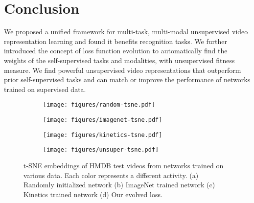 \documentclass[10pt,twocolumn,letterpaper]{article}
\begin{document}
\vspace{-2mm}
\section{Conclusion}
\vspace{-1mm}
We proposed a unified framework for multi-task, multi-modal unsupervised video representation learning and found it benefits recognition tasks. We further introduced the concept of loss function evolution to automatically find the weights of the self-supervised tasks and modalities, with unsupervised fitness measure. We find powerful unsupervised video representations that outperform prior self-supervised tasks and can match or improve the performance of networks trained on supervised data.











{\small


}

\clearpage
\newpage
\appendix


\begin{figure*}
\begin{subfigure}{.5\textwidth}
  \centering
  \texttt{[image: figures/random-tsne.pdf]}
  \caption{}
  \label{fig:tsnesfig1}
\end{subfigure}\begin{subfigure}{.5\textwidth}
  \centering
  \texttt{[image: figures/imagenet-tsne.pdf]}
  \caption{}
  \label{fig:tsnesfig2}
\end{subfigure}
\begin{subfigure}{.5\textwidth}
  \centering
  \texttt{[image: figures/kinetics-tsne.pdf]}
  \caption{}
  \label{fig:tsnesfig3}
\end{subfigure}\begin{subfigure}{.5\textwidth}
  \centering
  \texttt{[image: figures/unsuper-tsne.pdf]}
  \caption{}
  \label{fig:tsnesfig4}
\end{subfigure}
\caption{t-SNE embeddings of HMDB test videos from networks trained on various data. Each color represents a different activity. (a) Randomly initialized network (b) ImageNet trained network (c) Kinetics trained network (d) Our evolved loss.}
\label{fig:fig}
\end{figure*}
\end{document}
